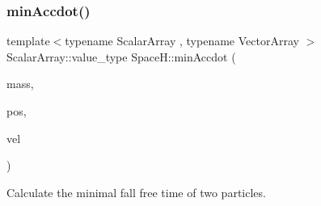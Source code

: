 \subsubsection{\texorpdfstring{min\+Accdot()}{minAccdot()}}
{\footnotesize\ttfamily template$<$typename Scalar\+Array , typename Vector\+Array $>$ \\
Scalar\+Array\+::value\+\_\+type Space\+H\+::min\+Accdot (\begin{DoxyParamCaption}\item[{const Scalar\+Array \&}]{mass,  }\item[{const Vector\+Array \&}]{pos,  }\item[{const Vector\+Array \&}]{vel }\end{DoxyParamCaption})\hspace{0.3cm}{\ttfamily [inline]}}



Calculate the minimal fall free time of two particles. 


